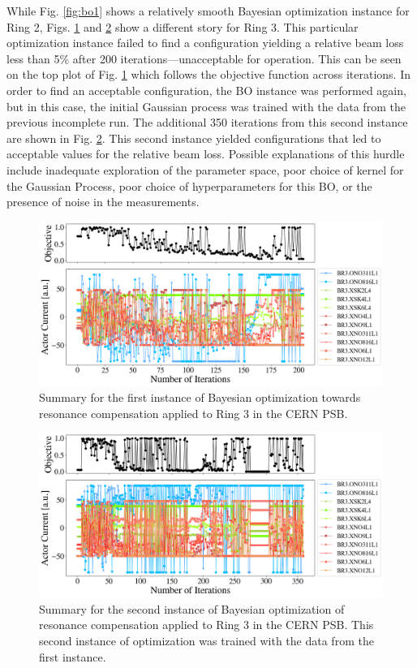 While Fig. \ref{fig:bo1} shows a relatively smooth Bayesian optimization instance for Ring 2, Figs. \ref{fig:bo21} and \ref{fig:bo22} show a different story for Ring 3. This particular optimization instance failed to find a configuration yielding a relative beam loss less than 5\% after 200 iterations---unacceptable for operation. This can be seen on the top plot of Fig. \ref{fig:bo21} which follows the objective function across iterations. In order to find an acceptable configuration, the BO instance was performed again, but in this case, the initial Gaussian process was trained with the data from the previous incomplete run. The additional 350 iterations from this second instance are shown in Fig. \ref{fig:bo22}. This second instance yielded configurations that led to acceptable values for the relative beam loss. Possible explanations of this hurdle include inadequate exploration of the parameter space, poor choice of kernel for the Gaussian Process, poor choice of hyperparameters for this BO, or the presence of noise in the measurements.

\begin{figure}[H]
    \centering
    \includegraphics[width=\linewidth]{chapter5/2023_05_02_R3_LHCramp_BayesOpt.png}
    \caption{Summary for the first instance of Bayesian optimization towards resonance compensation applied to Ring 3 in the CERN PSB.}
    \label{fig:bo21}
\end{figure}

\begin{figure}[H]
    \centering
    \includegraphics[width=\linewidth]{chapter5/2023_05_02_R3_LHCramp_BayesOpt_itrtn2.png}
    \caption{Summary for the second instance of Bayesian optimization of resonance compensation applied to Ring 3 in the CERN PSB. This second instance of optimization was trained with the data from the first instance.}
    \label{fig:bo22}
\end{figure}

